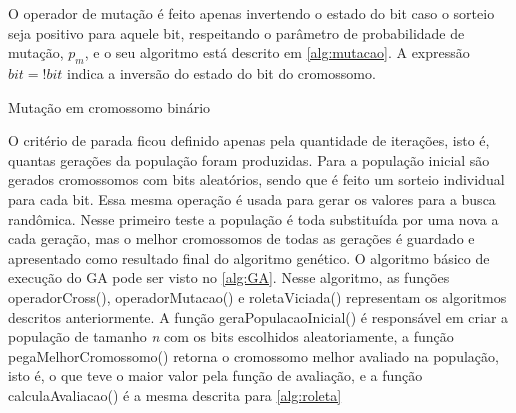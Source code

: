 O operador de mutação é feito apenas invertendo o estado do bit caso o sorteio seja positivo para aquele bit, respeitando o parâmetro de probabilidade de mutação, \(p_m\), e o seu algoritmo está descrito em \autoref{alg:mutacao}. A expressão \(bit = !bit\) indica a inversão do estado do bit do cromossomo.

\begin{algorithm}[h!]
	\LinesNumbered
	\caption{Mutação em cromossomo binário}
	\label{alg:mutacao}
\end{algorithm}

O critério de parada ficou definido apenas pela quantidade de iterações, isto é, quantas gerações da população foram produzidas. Para a população inicial são gerados cromossomos com bits aleatórios, sendo que é feito um sorteio individual para cada bit. Essa mesma operação é usada para gerar os valores para a busca randômica. Nesse primeiro teste a população é toda substituída por uma nova a cada geração, mas o melhor cromossomos de todas as gerações é guardado e apresentado como resultado final do algoritmo genético. O algoritmo básico de execução do GA pode ser visto no \autoref{alg:GA}. Nesse algoritmo, as funções \textsf{operadorCross()}, \textsf{operadorMutacao()} e \textsf{roletaViciada()} representam os algoritmos descritos anteriormente. A função \textsf{geraPopulacaoInicial()} é responsável em criar a população de tamanho \textit{n} com os bits escolhidos aleatoriamente, a função \mbox{\textsf{pegaMelhorCromossomo()}} retorna o cromossomo melhor avaliado na população, isto é, o que teve o maior valor pela função de avaliação, e a função \textsf{calculaAvaliacao()} é a mesma descrita para \autoref{alg:roleta}

